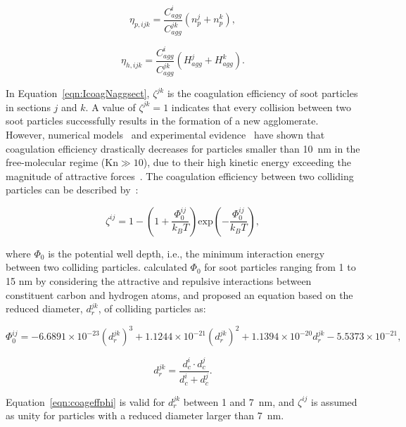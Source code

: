 \begin{equation}
	\eta_{p,ijk}=
	\frac{C^i_{agg}}{C^{jk}_{agg}}
	\left(
	n^j_p + n^k_p
	\right),
	\label{eqn:etapcoag}
\end{equation}

\begin{equation}
	\eta_{h,ijk}=
	\frac{C^i_{agg}}{C^{jk}_{agg}}
	\left(
	H^j_{agg} + H^k_{agg}
	\right).
	\label{eqn:etahcoag}
\end{equation}


In Equation~\eqref{eqn:IcoagNaggsect}, $\zeta^{jk}$ is the coagulation efficiency of soot particles in sections $j$ and $k$. A value of $\zeta^{jk} = 1$ indicates that every collision between two soot particles successfully results in the formation of a new agglomerate. However, numerical models~\citep{narsimhan1985brownian} and experimental evidence~\citep{d2005surface} have shown that coagulation efficiency drastically decreases for particles smaller than 10~nm in the free-molecular regime ($\mathrm{Kn}\gg10$), due to their high kinetic energy exceeding the magnitude of attractive forces~\citep{wang1991filtration}. The coagulation efficiency between two colliding particles can be described by~\citep{narsimhan1985brownian}:


\begin{equation}
	\zeta^{ij} = 1 - 
	\left(1 + \frac{\Phi^{ij}_0}{k_BT} \right)
	\mathrm{exp}\left(-\frac{\Phi^{ij}_0}{k_BT}\right),
	\label{eqn:coageff}
\end{equation}

\noindent where $\Phi_0$ is the potential well depth, i.e., the minimum interaction energy between two colliding particles. \citet{hou2020coagulation} calculated $\Phi_0$ for soot particles ranging from 1 to 15 nm by considering the attractive and repulsive interactions between constituent carbon and hydrogen atoms, and proposed an equation based on the reduced diameter, $d^{jk}_r$, of colliding particles as:

\begin{equation}
	\Phi^{ij}_0 = -6.6891\times10^{-23} (d^{jk}_r)^3 + 1.1244\times10^{-21} (d^{jk}_r)^2 + 1.1394\times10^{-20} d^{jk}_r - 5.5373\times10^{-21},
	\label{eqn:coageffphi}
\end{equation}

\begin{equation}
	d^{jk}_r = \frac{d^i_c\cdot d^j_c}{d^i_c+d^j_c}.
	\label{eqn:coageffredcueddia}
\end{equation}

Equation~\eqref{eqn:coageffphi} is valid for $d^{jk}_r$ between 1 and 7~nm, and $\zeta^{ij}$ is assumed as unity for particles with a reduced diameter larger than 7~nm.


